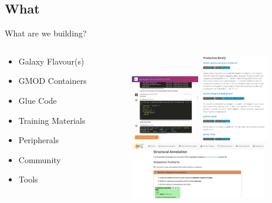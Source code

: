 \documentclass[12pt]{phage3slides} %
\begin{document}
\subsection{What}
\begin{frame}{What are we building?}
    \begin{columns}
        \begin{column}{0.38\textwidth}
            \begin{itemize}
                \item Galaxy Flavour(s)
                \item GMOD Containers
                \item Glue Code
                \item Training Materials
                \item Peripherals
                \item Community
                \item Tools
            \end{itemize}
        \end{column}
        \begin{column}{0.58\textwidth}
            \includegraphics[width=3cm]{img/gga-chat.png}
            \includegraphics[width=3cm]{img/gga-gh.png} \\[.7cm]
            \includegraphics[width=6cm]{img/gga-docs.png}
        \end{column}
    \end{columns}
\end{frame}
\end{document}

